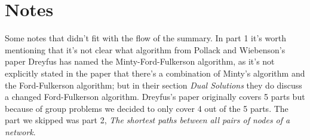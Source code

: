 \documentclass{article}
\begin{document}
\section*{Notes}
Some notes that didn't fit with the flow of the summary.
In part 1 it's worth mentioning that it's not clear what algorithm from
Pollack and Wiebenson's paper Dreyfus has named the Minty-Ford-Fulkerson
algorithm, as it's not explicitly stated in the paper that there's a combination
of Minty's algorithm and the Ford-Fulkerson algorithm; but in their section \textit{Dual
Solutions} they do discuss a changed Ford-Fulkerson algorithm. Dreyfus's
paper originally covers 5 parts but because of group problems we decided to
only cover 4 out of the 5 parts. The part we skipped was part 2, 
\textit{The shortest paths between all pairs of nodes of a network}. 

\newpage
\printbibliography[]
\end{document}
